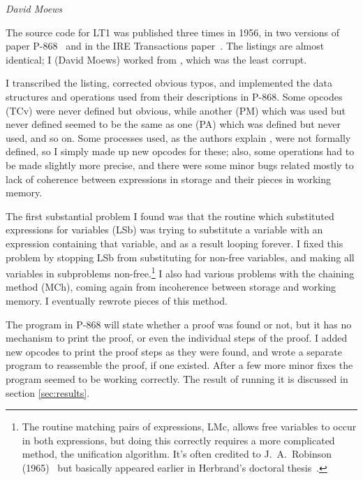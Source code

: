 \documentclass[journal]{IEEEtran}
\begin{document}
%
%

{\em David Moews}

The source code for LT1 was published three times in 1956, in two
versions of paper P-868~\cite{LT1956a,LT1956b} and in the 
IRE Transactions paper~\cite{LT1956c}.  The listings are almost identical; I
(David Moews) worked from \cite{LT1956b}, which was the least corrupt.

I transcribed the listing, corrected obvious typos, and
implemented the data structures and operations used from their
descriptions in P-868.  Some opcodes (TCv) were never defined
but obvious, while another (PM) which was used but never defined
seemed to be the same as one (PA) which was defined but never
used, and so on.  Some processes used, as the authors explain
\cite[p.~50]{LT1956b}, were not formally defined, so I simply
made up new opcodes for these; also, some operations had to
be made slightly more precise, and there were some minor bugs
related mostly to lack of coherence between expressions in
storage and their pieces in working memory.  

The first substantial problem I found was that the routine 
which substituted expressions for variables (LSb)
was trying to substitute a variable with an expression
containing that variable, and as a result looping forever.  
I fixed this problem by stopping LSb from substituting
for non-free variables, and making all variables in subproblems
non-free.\footnote{The routine matching pairs of expressions, LMc, allows
free variables to occur in both expressions, but doing this correctly 
requires a more complicated method, the unification algorithm.  It's 
often credited to J.~A.~Robinson (1965)~\cite{robinson1965} but basically
appeared earlier in Herbrand's doctoral thesis~\cite[Section~18]{lecherbrand2009}.}
I also had various problems with the chaining method (MCh),
coming again from incoherence between storage and working
memory.  I eventually rewrote pieces of this method.

The program in P-868 will state whether a proof was found or not,
but it has no mechanism to print the proof, or even the individual
steps of the proof.  I added new opcodes to print the proof steps
as they were found, and wrote a separate program to reassemble the 
proof, if one existed.  After a few more minor fixes the program seemed 
to be working correctly.  The result of running it is discussed in section
\ref{sec:results}.
\end{document}
